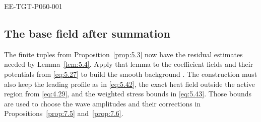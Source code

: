 %
\begin{EESegment}{EE-TGT-P060-001}
\subsection{The base field after summation}\label{sec:5.5}
The finite tuples  from Proposition~\ref{prop:5.3} now have the residual estimates
needed by Lemma~\ref{lem:5.4}. Apply that lemma to the coefficient fields and their potentials
 from \eqref{eq:5.27} to build the smooth background
. The construction must also keep the leading profile as in \eqref{eq:5.42}, the exact heat
field outside the active region from \eqref{eq:4.29}, and the weighted stress bounds in \eqref{eq:5.43}. Those bounds are
used to choose the wave amplitudes and their corrections in Propositions~\ref{prop:7.5} and~\ref{prop:7.6}.
\end{EESegment}

